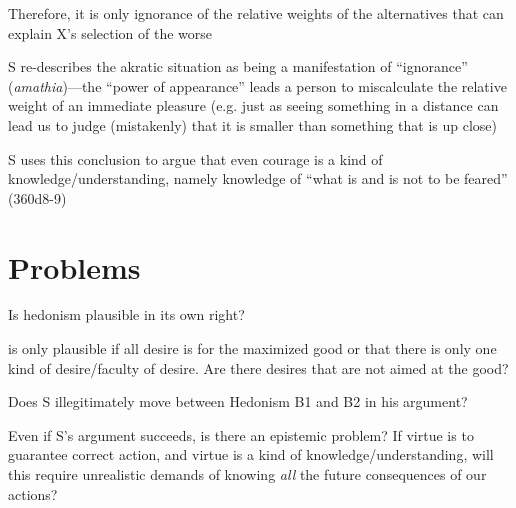 \documentclass[11pt]{article}
\begin{document}
 \noindent [C] Therefore, it is only ignorance of the relative weights of the alternatives that can explain X's selection of the worse
\vspace*{2mm}
 
 \noindent S re-describes the akratic situation as being a manifestation of ``ignorance'' (\emph{amathia})---the ``power of appearance'' leads a person to miscalculate the relative weight of an immediate pleasure (e.g. just as seeing something in a distance can lead us to judge (mistakenly) that it is smaller than something that is up close)
 \vspace*{2mm}
 
 \noindent S uses this conclusion to argue that even courage is a kind of knowledge/understanding, namely knowledge of ``what is and is not to be feared'' (360d8-9)
 
\section*{Problems}
 
 \noindent Is hedonism plausible in its own right?
 \vspace*{2mm}
 
 \noindent [P6] is only plausible if all desire is for the maximized good or that there is only one kind of desire/faculty of desire. Are there desires that are not aimed at the good?
 \vspace*{2mm}
  
 \noindent Does S illegitimately move between Hedonism B1 and B2 in his argument?
 \vspace*{2mm}
 
 \noindent Even if S's argument succeeds, is there an epistemic problem? If virtue is to guarantee correct action, and virtue is a kind of knowledge/understanding, will this require unrealistic demands of knowing \emph{all} the future consequences of our actions?
\end{document}
